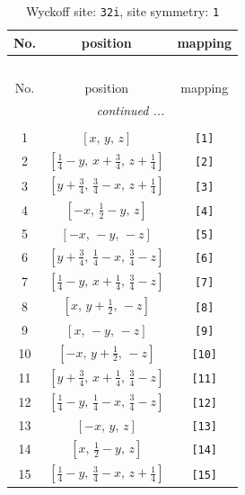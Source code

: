 \documentclass[fleqn,8pt]{jsarticle}
\begin{document}
\renewcommand{\arraystretch}{1.2}
\begin{longtable}{ccc}
\caption{Wyckoff site: {\tt 32i}, site symmetry: {\tt 1}}
 \\
 \hline \hline
No. & position & mapping \\ \hline \endfirsthead

\multicolumn{2}{l}{\tablename\ \thetable{}} \\
 \hline \hline
No. & position & mapping \\ \hline \endhead

 \hline \hline
\multicolumn{2}{r}{\footnotesize\it continued ...} \\ \endfoot

 \hline \hline
\multicolumn{2}{r}{} \\ \endlastfoot

1 & $\left[ x,\, y,\, z \right]$ & {\tt [1]} \\ \hline
2 & $\left[ \frac{1}{4} - y,\, x + \frac{3}{4},\, z + \frac{1}{4} \right]$ & {\tt [2]} \\ \hline
3 & $\left[ y + \frac{3}{4},\, \frac{3}{4} - x,\, z + \frac{1}{4} \right]$ & {\tt [3]} \\ \hline
4 & $\left[ - x,\, \frac{1}{2} - y,\, z \right]$ & {\tt [4]} \\ \hline
5 & $\left[ - x,\, - y,\, - z \right]$ & {\tt [5]} \\ \hline
6 & $\left[ y + \frac{3}{4},\, \frac{1}{4} - x,\, \frac{3}{4} - z \right]$ & {\tt [6]} \\ \hline
7 & $\left[ \frac{1}{4} - y,\, x + \frac{1}{4},\, \frac{3}{4} - z \right]$ & {\tt [7]} \\ \hline
8 & $\left[ x,\, y + \frac{1}{2},\, - z \right]$ & {\tt [8]} \\ \hline
9 & $\left[ x,\, - y,\, - z \right]$ & {\tt [9]} \\ \hline
10 & $\left[ - x,\, y + \frac{1}{2},\, - z \right]$ & {\tt [10]} \\ \hline
11 & $\left[ y + \frac{3}{4},\, x + \frac{1}{4},\, \frac{3}{4} - z \right]$ & {\tt [11]} \\ \hline
12 & $\left[ \frac{1}{4} - y,\, \frac{1}{4} - x,\, \frac{3}{4} - z \right]$ & {\tt [12]} \\ \hline
13 & $\left[ - x,\, y,\, z \right]$ & {\tt [13]} \\ \hline
14 & $\left[ x,\, \frac{1}{2} - y,\, z \right]$ & {\tt [14]} \\ \hline
15 & $\left[ \frac{1}{4} - y,\, \frac{3}{4} - x,\, z + \frac{1}{4} \right]$ & {\tt [15]} \\ \hline

\end{longtable}
\end{document}
